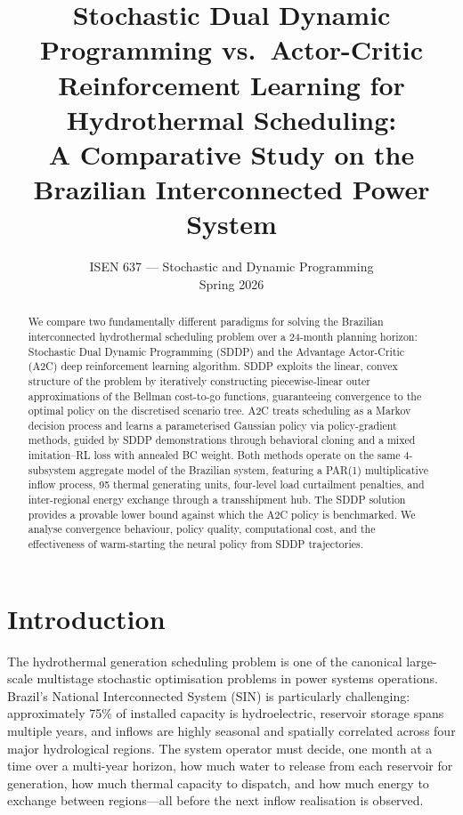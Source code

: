 \documentclass[11pt,letterpaper]{article}
\title{%
  \textbf{Stochastic Dual Dynamic Programming vs.\ Actor-Critic\\[4pt]
  Reinforcement Learning for Hydrothermal Scheduling:\\[4pt]
  A Comparative Study on the Brazilian Interconnected Power System}
}
\author{%
  ISEN 637 --- Stochastic and Dynamic Programming\\[4pt]
  \small Spring 2026
}
\date{}
\begin{document}
\maketitle

\begin{abstract}
We compare two fundamentally different paradigms for solving the Brazilian
interconnected hydrothermal scheduling problem over a 24-month planning horizon:
Stochastic Dual Dynamic Programming (SDDP) and the Advantage Actor-Critic (A2C)
deep reinforcement learning algorithm.
SDDP exploits the linear, convex structure of the problem by iteratively
constructing piecewise-linear outer approximations of the Bellman cost-to-go
functions, guaranteeing convergence to the optimal policy on the discretised
scenario tree.
A2C treats scheduling as a Markov decision process and learns a parameterised
Gaussian policy via policy-gradient methods, guided by SDDP demonstrations
through behavioral cloning and a mixed imitation--RL loss with annealed BC weight.
Both methods operate on the same 4-subsystem aggregate model of the Brazilian
system, featuring a PAR(1) multiplicative inflow process, 95 thermal generating
units, four-level load curtailment penalties, and inter-regional energy exchange
through a transshipment hub.
The SDDP solution provides a provable lower bound against which the A2C policy is
benchmarked.
We analyse convergence behaviour, policy quality, computational cost, and the
effectiveness of warm-starting the neural policy from SDDP trajectories.
\end{abstract}

\tableofcontents
\clearpage

\section{Introduction}
\label{sec:intro}

The hydrothermal generation scheduling problem is one of the canonical large-scale
multistage stochastic optimisation problems in power systems operations.
Brazil's National Interconnected System (SIN) is particularly challenging:
approximately 75\% of installed capacity is hydroelectric, reservoir storage spans
multiple years, and inflows are highly seasonal and spatially correlated across
four major hydrological regions.
The system operator must decide, one month at a time over a multi-year horizon,
how much water to release from each reservoir for generation, how much thermal
capacity to dispatch, and how much energy to exchange between regions---all before
the next inflow realisation is observed.
\end{document}
